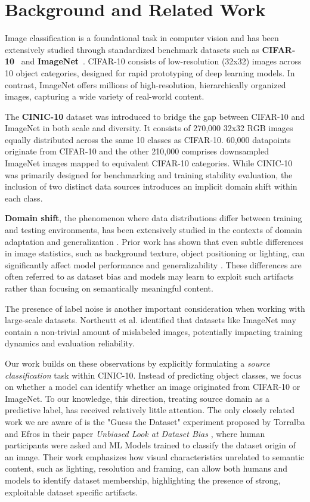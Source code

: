 \section{Background and Related Work}

Image classification is a foundational task in computer vision and has been extensively studied through standardized benchmark datasets such as \textbf{CIFAR-10}~\cite{krizhevsky2009learning} 
and \textbf{ImageNet}~\cite{deng2009imagenet}. CIFAR-10 consists of low-resolution (32x32) images across 10 object categories, 
designed for rapid prototyping of deep learning models. In contrast, ImageNet offers millions of high-resolution, hierarchically organized images, capturing a wide variety of real-world content.

The \textbf{CINIC-10} dataset \cite{darlow2018cinic} was introduced to bridge the gap between CIFAR-10 and ImageNet in both scale and diversity. It consists of 
270,000 32x32 RGB images equally distributed across the same 10 classes as CIFAR-10. 60,000 datapoints originate from CIFAR-10 and the other 210,000 comprises downsampled ImageNet 
images mapped to equivalent CIFAR-10 categories. While CINIC-10 was primarily designed for benchmarking and training stability evaluation, the inclusion of two distinct data sources 
introduces an implicit domain shift within each class.

\textbf{Domain shift}, the phenomenon where data distributions differ between training and testing environments, has been extensively studied in the contexts of domain adaptation and 
generalization \cite{wang2018deep}. Prior work has shown that even subtle differences in image statistics, such as background texture, object positioning or lighting, can significantly 
affect model performance and generalizability \cite{torralba2011unbiased, recht2019imagenet}. These differences are often referred to as dataset bias and models may learn to exploit such 
artifacts rather than focusing on semantically meaningful content.

The presence of label noise is another important consideration when working with large-scale datasets. Northcutt et al. \cite{northcutt2021confident} identified that datasets like ImageNet 
may contain a non-trivial amount of mislabeled images, potentially impacting training dynamics and evaluation reliability.

Our work builds on these observations by explicitly formulating a \textit{source classification} task within CINIC-10. Instead of predicting object classes, we focus on whether a model
can identify whether an image originated from CIFAR-10 or ImageNet. To our knowledge, this direction, treating source domain as a predictive label, has received relatively little attention. 
The only closely related work we are aware of is the "Guess the Dataset" experiment proposed by Torralba and Efros in their paper \textit{Unbiased Look at Dataset Bias} 
\cite{torralba2011unbiased}, where human participants were asked and ML Models trained to classify the dataset origin of an image. 
Their work emphasizes how visual characteristics unrelated to semantic content, such as lighting, resolution and framing, can allow both humans and models to identify dataset membership, 
highlighting the presence of strong, exploitable dataset specific artifacts.
